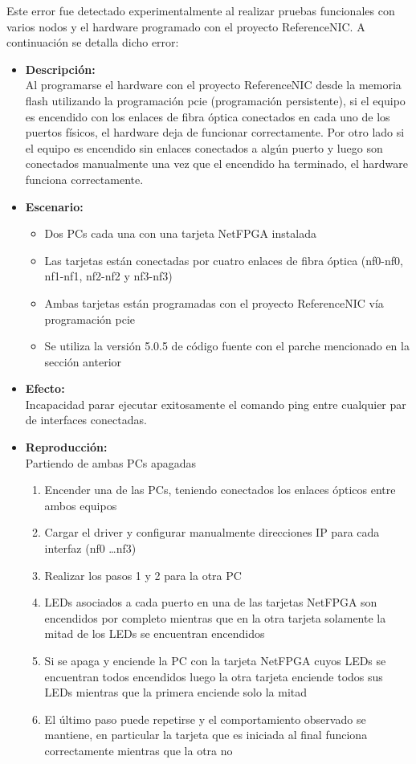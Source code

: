 Este error fue detectado experimentalmente al realizar pruebas funcionales con varios nodos y el hardware programado con el proyecto ReferenceNIC. A continuación se detalla dicho error:

\begin{itemize}
\item \textbf{Descripci\'on:}\\
Al programarse el hardware con el proyecto ReferenceNIC desde la memoria flash utilizando la programaci\'on pcie (programación persistente), si el equipo es encendido con los enlaces de fibra óptica conectados en cada uno de los puertos físicos, el hardware deja de funcionar correctamente. Por otro lado si el equipo es encendido sin enlaces conectados a algún puerto y luego son conectados manualmente una vez que el encendido ha terminado, el hardware funciona correctamente.

\item \textbf{Escenario:}
\begin{itemize}
\item Dos PCs cada una con una tarjeta NetFPGA instalada
\item Las tarjetas están conectadas por cuatro enlaces de fibra \'optica (nf0-nf0, nf1-nf1, nf2-nf2 y nf3-nf3)
\item Ambas tarjetas están programadas con el proyecto ReferenceNIC vía programaci\'on pcie
\item Se utiliza la versi\'on 5.0.5 de c\'odigo fuente con el parche mencionado en la sección anterior
\end{itemize}

\item \textbf{Efecto:}\\
Incapacidad parar ejecutar exitosamente el comando ping entre cualquier par de interfaces conectadas.

\item \textbf{Reproducci\'on:}\\
Partiendo de ambas PCs apagadas
\begin{enumerate}
\item Encender una de las PCs, teniendo conectados los enlaces \'opticos entre ambos equipos
\item Cargar el driver y configurar manualmente direcciones IP para cada interfaz (nf0 \dots nf3)
\item Realizar los pasos 1 y 2 para la otra PC
\item LEDs asociados a cada puerto en una de las tarjetas NetFPGA son encendidos por completo mientras que en la otra tarjeta solamente la mitad de los LEDs se encuentran encendidos
\item Si se apaga y enciende la PC con la tarjeta NetFPGA cuyos LEDs se encuentran todos encendidos luego la otra tarjeta enciende todos sus LEDs mientras que la primera enciende solo la mitad
\item El \'ultimo paso puede repetirse y el comportamiento observado se mantiene, en particular la tarjeta que es iniciada al final funciona correctamente mientras que la otra no
\end{enumerate} 


\end{itemize}

